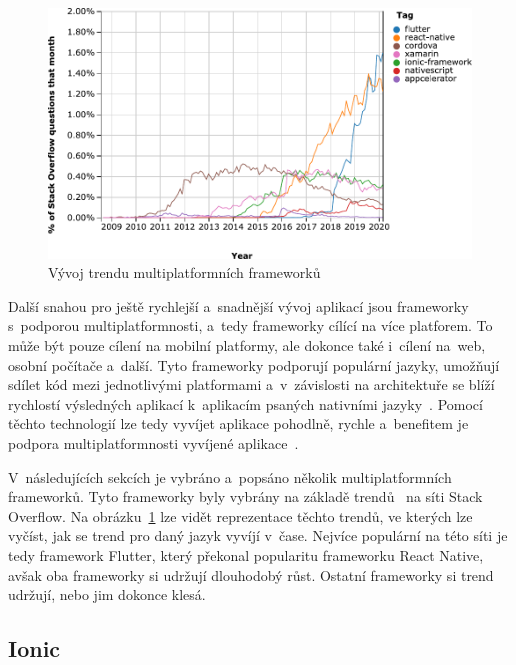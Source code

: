 \begin{figure}
    \centering
    \includegraphics[width=\linewidth]{assets/technology-research/framework/popularity.pdf}
    \caption{Vývoj trendu multiplatformních
    frameworků~\cite{framework_popularity}}
    \label{fig:framework_popularity}
\end{figure}

Další snahou pro ještě rychlejší a~snadnější vývoj aplikací jsou frameworky
s~podporou multiplatformnosti,
a~tedy frameworky cílící na více platforem.
To může být pouze cílení na mobilní platformy,
ale dokonce také i~cílení na~web, osobní počítače a~další.
Tyto frameworky podporují populární jazyky,
umožňují sdílet kód mezi jednotlivými platformami
a~v~závislosti na architektuře se blíží rychlostí výsledných aplikací
k~aplikacím psaných nativními jazyky~\cite{hackernoon_flutter}.
Pomocí těchto technologií lze tedy vyvíjet aplikace pohodlně, rychle
a~benefitem  je podpora multiplatformnosti vyvíjené
aplikace~\cite{dashmagazine_mobile_frameworks}.

\pagebreak
V~následujících sekcích je vybráno a~popsáno několik multiplatformních
frameworků.
Tyto frameworky byly vybrány na základě trendů~\cite{framework_popularity}
na síti Stack Overflow.
Na obrázku~\ref{fig:framework_popularity} lze vidět reprezentace těchto trendů,
ve kterých lze vyčíst,
jak se trend pro daný jazyk vyvíjí v~čase.
Nejvíce populární na této síti je tedy framework Flutter,
který překonal popularitu frameworku React Native,
avšak oba frameworky si udržují dlouhodobý růst.
Ostatní frameworky si trend udržují,
nebo jim dokonce klesá.

\subsection{Ionic}

